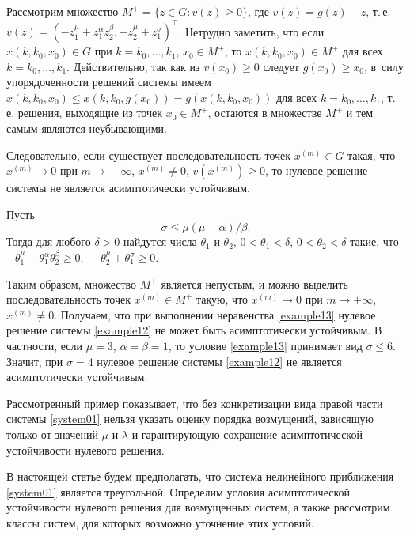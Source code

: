 \begin{example}[1]
Рассмотрим множество $M^+=\{z\in G:v(z)\geq0\}$, где
$v(z)=g(z)-z$, т.\,е. $v(z)=(-z_1^\mu+z_1^\alpha z_2^\beta, 
-z_2^\mu+z_1^\sigma)^\top $. Нетрудно заметить, что если
$x(k, k_0, x_0)\in G$ при $k=k_0, \ldots, k_1$, $x_0\in M^+$, то
$x(k, k_0, x_0)\in M^+$ для всех $k=k_0, \ldots, k_1$. Действительно,
так как из $v(x_0)\geq0$ следует $g(x_0)\geq x_0$, в~силу
упорядоченности решений системы имеем $x(k, k_0, x_0)\leq
x(k, k_0, g(x_0))=g(x(k, k_0, x_0))$ для всех $k=k_0, \ldots, k_1$,
т.\,е. решения, выходящие из точек $x_0\in M^+$, остаются в множестве $M^+$ и тем самым являются неубывающими.

Следовательно, если существует последовательность точек $x^{(m)}\in G$ такая, что
$x^{(m)}\to 0$ при $m\to$ $+\infty$, $x^{(m)}\neq 0$, $v(x^{(m)})\geq
0$, то нулевое решение системы не является асимптотически устойчивым.

Пусть
\begin{equation}
\sigma\leq\mu(\mu-\alpha)/\beta. \label{example13}
\end{equation}
Тогда для любого $\delta>0$ найдутся числа $\theta_1$  и
$\theta_2$, $0<\theta_1<\delta$, $0<\theta_2<\delta$  такие, что $
-\theta_1^\mu+\theta_1^\alpha \theta_2^\beta\geq 0, \,
-\theta_2^\mu+\theta_1^\sigma\geq 0.
$

Таким образом, множество $M^+$ является непустым, и можно выделить
последовательность точек $x^{(m)}\in M^+$ такую, что $x^{(m)}\to
0$ при $m\to+\infty$, $x^{(m)}\neq 0$. Получаем, что при
выполнении неравенства \eqref{example13} нулевое решение системы
\eqref{example12} не может быть асимптотически устойчивым.
В частности, если $\mu=3$, $\alpha=\beta=1$, то условие
\eqref{example13} принимает вид
 $\sigma\leq 6$. Значит, при $\sigma=4$  нулевое решение  системы \eqref{example12}
не является  асимптотически устойчивым.
\end{example}

Рассмотренный пример показывает, что без конкретизации вида правой
части системы \eqref{system01} нельзя указать оценку порядка
возмущений, зависящую только от значений $\mu$ и $\lambda$ и
гарантирующую сохранение асимптотической устойчивости нулевого
решения.

В настоящей статье будем предполагать, что  система нелинейного
приближения \eqref{system01} является треугольной. Определим
условия асимптотической устойчивости нулевого решения для
возмущенных систем, а также рассмотрим классы систем, для которых
возможно уточнение этих условий.

